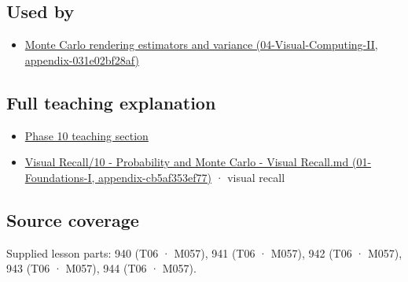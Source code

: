 \subsection{Used by}\label{appendix-8d863ed954d0-used-by}

\begin{itemize}
\tightlist
\item
  \href{../04-Visual-Computing-II/main.pdf\#nameddest=appendix-031e02bf28af}{Monte Carlo rendering estimators and variance (04-Visual-Computing-II, appendix-031e02bf28af)}
\end{itemize}

\subsection{Full teaching explanation}\label{appendix-8d863ed954d0-full-teaching-explanation}

\begin{itemize}
\tightlist
\item
  \hyperref[02-foundations-ii-ch029-transformations-turn-simple-inputs-into-useful-samples]{Phase 10 teaching section}
\item
  \href{../01-Foundations-I/main.pdf\#nameddest=appendix-cb5af353ef77}{Visual Recall/10 - Probability and Monte Carlo - Visual Recall.md (01-Foundations-I, appendix-cb5af353ef77)} · visual recall
\end{itemize}

\subsection{Source coverage}\label{appendix-8d863ed954d0-source-coverage}

Supplied lesson parts: 940 (T06 · M057), 941 (T06 · M057), 942 (T06 · M057), 943 (T06 · M057), 944 (T06 · M057).
